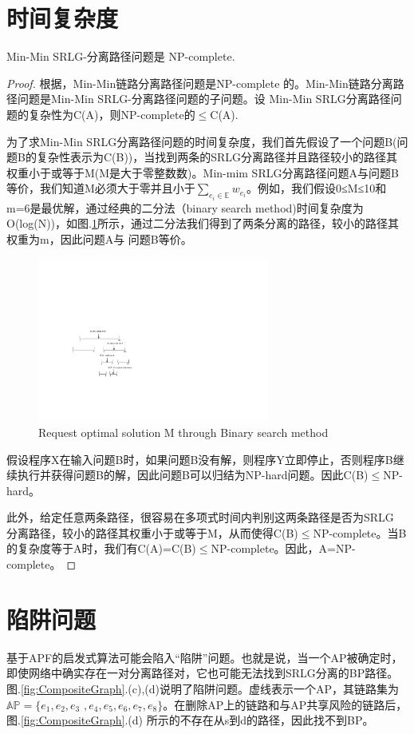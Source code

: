 \section{时间复杂度}
\begin{theorem}
\label{le:lemma1}
    Min-Min SRLG-分离路径问题是 NP-complete.
\end{theorem}
\begin{proof}
根据\cite{bhatia2006finding}，Min-Min链路分离路径问题是NP-complete 的。Min-Min链路分离路径问题是Min-Min SRLG-分离路径问题的子问题。设
Min-Min SRLG分离路径问题的复杂性为C(A)，则NP-complete的$\leq$C(A).

为了求Min-Min SRLG分离路径问题的时间复杂度，我们首先假设了一个问题B(问题B的复杂性表示为C(B))，当找到两条的SRLG分离路径并且路径较小的路径其权重小于或等于M(M是大于零整数数)。Min-mim SRLG分离路径问题A与问题B等价，我们知道M必须大于零并且小于$\sum\limits_{e_i\in \mathbb{E}}w_{e_i}$。例如，我们假设0≤M≤10和m=6是最优解，通过经典的二分法（binary search method)时间复杂度为O(log(N))，如图.\ref{fig:binarySearch}所示，通过二分法我们得到了两条分离的路径，较小的路径其权重为m，因此问题A与 问题B等价。
\begin{figure}[htp]
  \centering
  \includegraphics[width=3.0in]{figures/binarySearch}
  \caption{Request optimal solution M through Binary search method }
  \label{fig:binarySearch}
\end{figure}
假设程序X在输入问题B时，如果问题B没有解，则程序Y立即停止，否则程序B继续执行并获得问题B的解，因此问题B可以归结为NP-hard问题。因此C(B)$\leq$NP-hard。

此外，给定任意两条路径，很容易在多项式时间内判别这两条路径是否为SRLG 分离路径，较小的路径其权重小于或等于M，从而使得C(B)$\leq$NP-complete。当B的复杂度等于A时，我们有C(A)=C(B)$\leq$NP-complete。因此，A=NP-complete。
\end{proof}
\section{陷阱问题}
基于APF的启发式算法可能会陷入“陷阱”问题。也就是说，当一个AP被确定时，即使网络中确实存在一对分离路径对，它也可能无法找到SRLG分离的BP路径。图.\ref{fig:CompositeGraph}.(c),(d)说明了陷阱问题。虚线表示一个AP，其链路集为$\mathbb{AP}=\{e_1,e_2,e_3$ $,e_4,e_5,e_6,e_7,e_8\}$。在删除AP上的链路和与AP共享风险的链路后，图.\ref{fig:CompositeGraph}.(d) 所示的不存在从s到d的路径，因此找不到BP。

